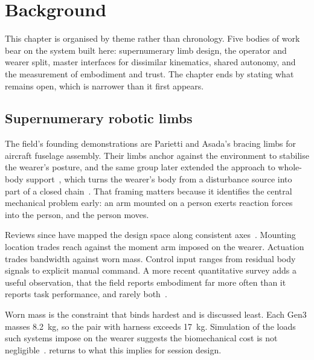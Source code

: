 \chapter{Background}
\label{ch:background}

This chapter is organised by theme rather than chronology. Five bodies of work
bear on the system built here: supernumerary limb design, the operator and
wearer split, master interfaces for dissimilar kinematics, shared autonomy,
and the measurement of embodiment and trust. The chapter ends by stating what
remains open, which is narrower than it first appears.

\section{Supernumerary robotic limbs}

The field's founding demonstrations are Parietti and Asada's bracing limbs for
aircraft fuselage assembly. Their limbs anchor against the environment to
stabilise the wearer's posture, and the same group later extended the
approach to whole-body support~\cite{parietti2016support}, which turns the wearer's body from a
disturbance source into part of a closed
chain~\cite{parietti2014bracing,parietti2013dynamic}. That framing matters
because it identifies the central mechanical problem early: an arm mounted on
a person exerts reaction forces into the person, and the person moves.

Reviews since have mapped the design space along consistent
axes~\cite{yang2021srlreview,prattichizzo2021augmentation,tong2021srlreview,zhang2023srlreview}.
Mounting location trades reach against the moment arm imposed on the wearer.
Actuation trades bandwidth against worn mass. Control input ranges from
residual body signals to explicit manual command. A more recent quantitative
survey adds a useful observation, that the field reports embodiment far more
often than it reports task performance, and rarely
both~\cite{zheng2026quantitative}.

Worn mass is the constraint that binds hardest and is discussed least. Each
Gen3 masses \SI{8.2}{\kilo\gram}, so the pair with harness exceeds
\SI{17}{\kilo\gram}. Simulation of the loads such systems impose on the wearer
suggests the biomechanical cost is not
negligible~\cite{moon2024impact}.  returns to what this
implies for session design.


